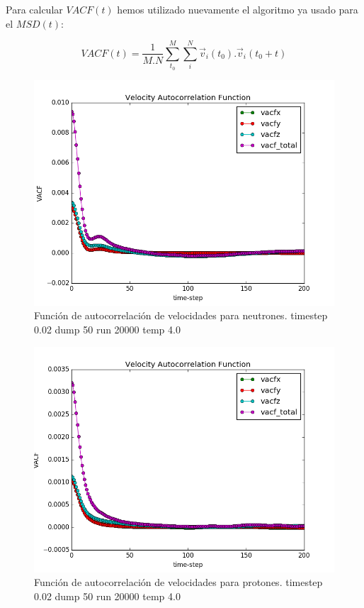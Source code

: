 \documentclass[
 reprint,
 amsmath,amssymb,
 aps,
 a4paper
]{revtex4-1}
\begin{document}
Para calcular $VACF(t)$ hemos utilizado nuevamente el algoritmo ya usado para el $MSD(t)$:

\begin{equation}\label{eq:MSD}
VACF(t)=\frac{1}{M.N}\sum_{t_0}^{M}\sum_{i}^{N}\vec{v}_i(t_0).\vec{v}_i(t_0+t)
\end{equation}

\begin{figure}[H]
\centerline{
  \includegraphics[width=1.0\linewidth]{vacf_N_200.png}}
  \caption{\small Función de autocorrelación de velocidades para neutrones. timestep 0.02 dump 50 run 20000 temp 4.0}
  \label{fig:vacf_N_200}
\end{figure}

\begin{figure}[H]
\centerline{
  \includegraphics[width=1.0\linewidth]{vacf_Z_200.png}}
  \caption{\small Función de autocorrelación de velocidades para protones. timestep 0.02 dump 50 run 20000 temp 4.0}
  \label{fig:vacf_Z_200}
\end{figure}
\end{document}

